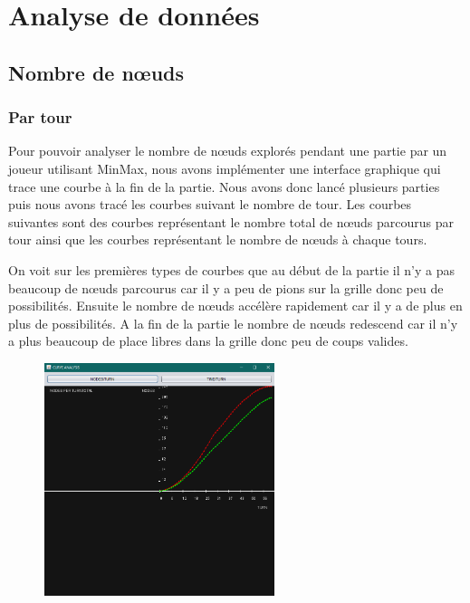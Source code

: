 \chapter{Analyse de données }

\section{Nombre de nœuds}
\subsection{Par tour}
\flushleft Pour pouvoir analyser le nombre de nœuds explorés pendant une partie par un joueur utilisant MinMax,
nous avons implémenter une interface graphique qui trace une courbe à la fin de la partie.
Nous avons donc lancé plusieurs parties puis nous avons tracé les courbes suivant le nombre de tour.
Les courbes suivantes sont des courbes représentant le nombre total de nœuds parcourus par tour ainsi 
que les courbes représentant le nombre de nœuds à chaque tours.

On voit sur les premières types de courbes que au début de la partie il n'y a pas beaucoup de nœuds
parcourus car il y a peu de pions sur la grille donc peu de possibilités. Ensuite le nombre de nœuds
accélère rapidement car il y a de plus en plus de possibilités. A la fin de la partie le nombre de nœuds
redescend car il n'y a plus beaucoup de place libres dans la grille donc peu de coups valides.


\begin{figure}[!ht]
\begin{center}
\includegraphics[width=0.60\textwidth]{./NODESPERTURN0}
\end{center}
\end{figure}
\newpage

